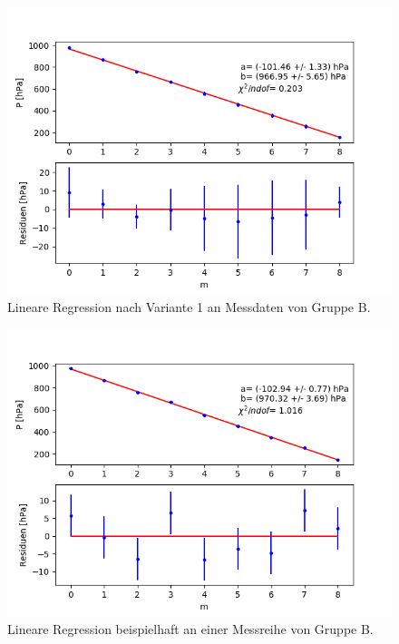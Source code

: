\documentclass[12pt,a4paper]{article}
\begin{document}
\begin{figure}
\centering
\includegraphics[scale=0.8]{Bilder/Druck_B_Var1.png}
\caption{Lineare Regression nach Variante 1 an Messdaten von Gruppe B.}
\label{fig:Druck_B_Var1}
\end{figure}

\begin{figure}
\centering
\includegraphics[scale=0.8]{Bilder/Druck_B_Var2.png}
\caption{Lineare Regression beispielhaft an einer Messreihe von Gruppe B.}
\label{fig:Druck_B_Var2}
\end{figure}
\end{document}
